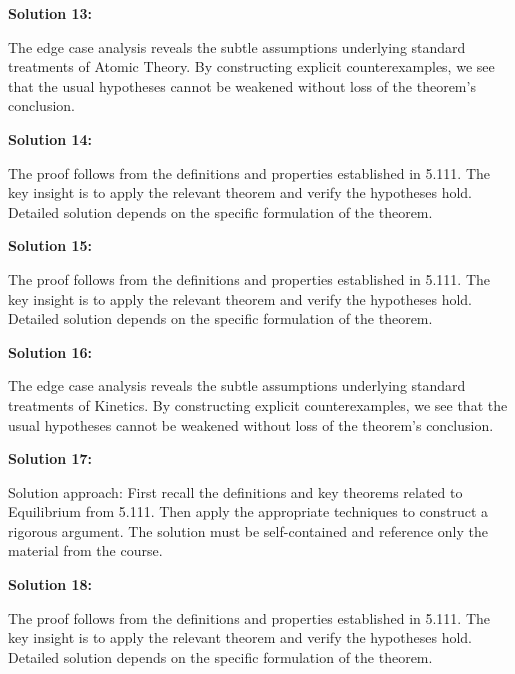 \documentclass[12pt,a4paper]{exam}
\begin{document}
\vspace{0.5cm}

\textbf{Solution 13:}

The edge case analysis reveals the subtle assumptions underlying standard treatments of Atomic Theory. By constructing explicit counterexamples, we see that the usual hypotheses cannot be weakened without loss of the theorem's conclusion.

\vspace{0.5cm}

\textbf{Solution 14:}

The proof follows from the definitions and properties established in 5.111. The key insight is to apply the relevant theorem and verify the hypotheses hold. Detailed solution depends on the specific formulation of the theorem.

\vspace{0.5cm}

\textbf{Solution 15:}

The proof follows from the definitions and properties established in 5.111. The key insight is to apply the relevant theorem and verify the hypotheses hold. Detailed solution depends on the specific formulation of the theorem.

\vspace{0.5cm}

\textbf{Solution 16:}

The edge case analysis reveals the subtle assumptions underlying standard treatments of Kinetics. By constructing explicit counterexamples, we see that the usual hypotheses cannot be weakened without loss of the theorem's conclusion.

\vspace{0.5cm}

\textbf{Solution 17:}

Solution approach: First recall the definitions and key theorems related to Equilibrium from 5.111. Then apply the appropriate techniques to construct a rigorous argument. The solution must be self-contained and reference only the material from the course.

\vspace{0.5cm}

\textbf{Solution 18:}

The proof follows from the definitions and properties established in 5.111. The key insight is to apply the relevant theorem and verify the hypotheses hold. Detailed solution depends on the specific formulation of the theorem.
\end{document}
